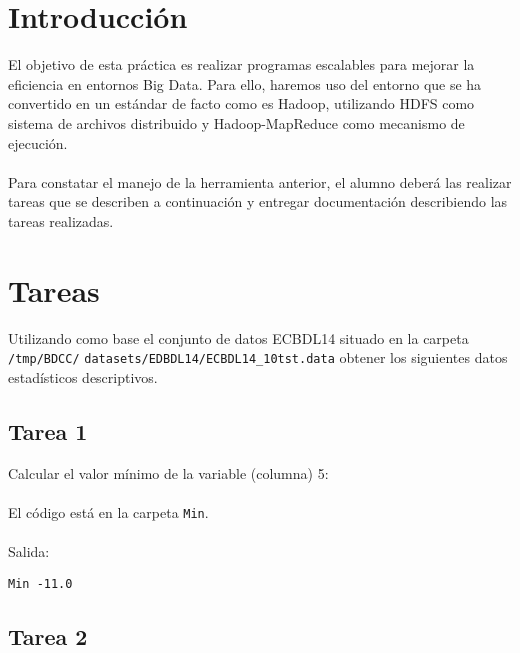 \newpage %

\tableofcontents %


\newpage


\section{Introducción}

El objetivo de esta práctica es realizar programas escalables para mejorar la eficiencia en entornos Big Data. Para ello, haremos uso del entorno que se ha convertido en un estándar de facto como es Hadoop, utilizando HDFS como sistema de archivos distribuido y Hadoop-MapReduce como mecanismo de ejecución.
\\ \\
Para constatar el manejo de la herramienta anterior, el alumno deberá las realizar tareas que se describen a continuación y entregar documentación describiendo las tareas realizadas.

\section{Tareas}

Utilizando como base el conjunto de datos ECBDL14 situado en la carpeta \texttt{/tmp/BDCC/} \texttt{datasets/EDBDL14/ECBDL14\_10tst.data} obtener los siguientes datos estadísticos descriptivos.

\subsection{Tarea 1}

Calcular el valor mínimo de la variable (columna) 5:
\\ \\
El código está en la carpeta \texttt{Min}.
\\ \\
Salida:

\begin{lstlisting}
Min -11.0
\end{lstlisting}

\subsection{Tarea 2}

